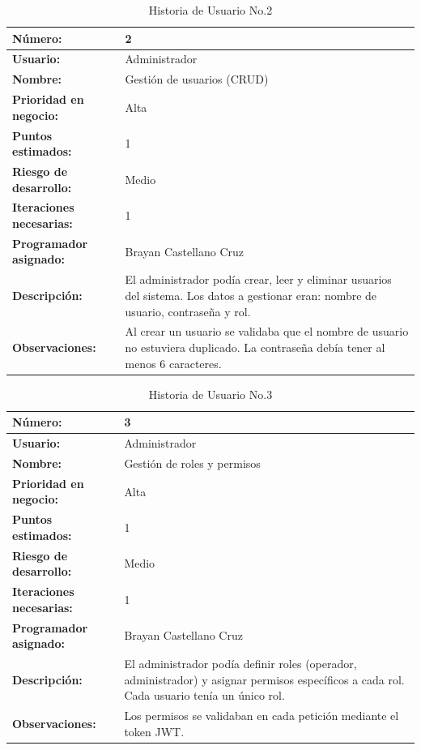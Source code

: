 \begin{table}[H]
\centering
\caption{Historia de Usuario No.2}
\label{tab:hu_02}
\footnotesize
\begin{tabular}{|p{3cm}|p{9cm}|}
\hline
\textbf{Número:} & 2 \\
\hline
\textbf{Usuario:} & Administrador \\
\hline
\textbf{Nombre:} & Gestión de usuarios (CRUD) \\
\hline
\textbf{Prioridad en negocio:} & Alta \\
\hline
\textbf{Puntos estimados:} & 1 \\
\hline
\textbf{Riesgo de desarrollo:} & Medio \\
\hline
\textbf{Iteraciones necesarias:} & 1 \\
\hline
\textbf{Programador asignado:} & Brayan Castellano Cruz \\
\hline
\textbf{Descripción:} & El administrador podía crear, leer y eliminar usuarios del sistema. Los datos a gestionar eran: nombre de usuario, contraseña y rol. \\
\hline
\textbf{Observaciones:} & Al crear un usuario se validaba que el nombre de usuario no estuviera duplicado. La contraseña debía tener al menos 6 caracteres. \\
\hline
\end{tabular}
\end{table}

\begin{table}[H]
\centering
\caption{Historia de Usuario No.3}
\label{tab:hu_03}
\footnotesize
\begin{tabular}{|p{3cm}|p{9cm}|}
\hline
\textbf{Número:} & 3 \\
\hline
\textbf{Usuario:} & Administrador \\
\hline
\textbf{Nombre:} & Gestión de roles y permisos \\
\hline
\textbf{Prioridad en negocio:} & Alta \\
\hline
\textbf{Puntos estimados:} & 1 \\
\hline
\textbf{Riesgo de desarrollo:} & Medio \\
\hline
\textbf{Iteraciones necesarias:} & 1 \\
\hline
\textbf{Programador asignado:} & Brayan Castellano Cruz \\
\hline
\textbf{Descripción:} & El administrador podía definir roles (operador, administrador) y asignar permisos específicos a cada rol. Cada usuario tenía un único rol. \\
\hline
\textbf{Observaciones:} & Los permisos se validaban en cada petición mediante el token JWT. \\
\hline
\end{tabular}
\end{table}

